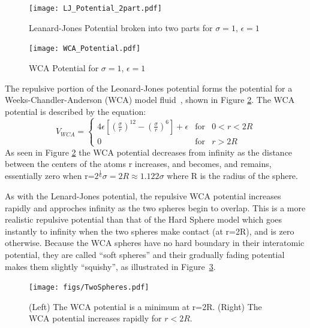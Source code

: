 \documentclass[double,12pt]{beavtex}
\begin{document}
\begin{figure}[h!]
    \centering
    \texttt{[image: LJ\_Potential\_2part.pdf]}
    \caption{Leanard-Jones Potential broken into two parts for $\sigma=1$, $\epsilon=1$}
    \label{fig:LJ_potential_2parts}
  \end{figure}

\begin{figure}[h!]
    \centering
    \texttt{[image: WCA\_Potential.pdf]}
    \caption{WCA Potential for $\sigma=1$, $\epsilon=1$}
    \label{fig:WCA_potential}
  \end{figure}

The repulsive portion of the Leonard-Jones potential forms the potential for a 
Weeks-Chandler-Anderson (WCA) model fluid~\cite{andersen1971relationship}, 
shown in Figure \ref{fig:WCA_potential}. 
The WCA potential is described by the equation: 
\begin{equation}{V_{WCA}=\left\{\begin{array}{rcl} {4\epsilon{\left[\left(\frac{\sigma}{r}\right)^{12} - \left(\frac{\sigma}{r}\right)^6 \right]}+\epsilon} & \mbox{for} & 0<r<{2R} \\ 0 & \mbox{for} & r>2R \end{array}\right.}\end{equation} 
As seen in Figure \ref{fig:WCA_potential} the WCA potential decreases 
from infinity as the distance between the centers of the atoms r increases, 
and becomes, and remains, essentially zero when 
r=$2^\frac{1}{6}\sigma=2R\approx{1.122}\sigma$ 
where R is the radius of the sphere. 

As with the Lenard-Jones potential, the repulsive WCA potential increases 
rapidly and approches infinity as the two spheres begin to overlap. This 
is a more realistic repulsive potential than that of the Hard Sphere model 
which goes instantly to infinity when the two spheres make contact (at r=2R), 
and is zero otherwise. Because the WCA spheres have no hard boundary in 
their interatomic potential, they are called ``soft spheres'' and their 
gradually fading potential makes them slightly ``squishy'', as illustrated in
Figure~\ref{fig:TwoSpheres}.

\begin{figure}[h!]
    \centering
    \texttt{[image: figs/TwoSpheres.pdf]} 
    \caption{(Left) The WCA potential is a minimum at r=2R. 
             (Right) The WCA potential increases rapidly for $r<2R$.}
    \label{fig:TwoSpheres}
    \end{figure} 
    
\end{document}
